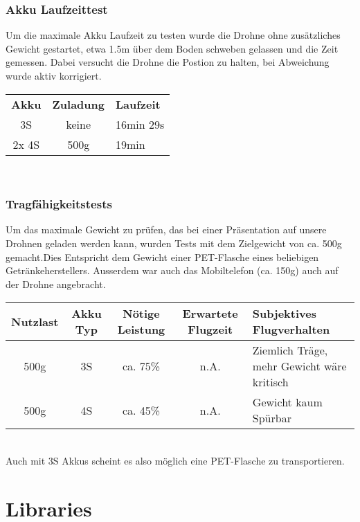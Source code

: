 \subsubsection{Akku Laufzeittest}
Um die maximale Akku Laufzeit zu testen wurde die Drohne ohne zusätzliches Gewicht gestartet, etwa 1.5m über dem Boden schweben gelassen und die Zeit gemessen. Dabei versucht die Drohne die Postion zu halten, bei Abweichung wurde aktiv korrigiert. \\

\begin{tabularx}{\textwidth}{|c|c|X}
    \hline
    \textbf{Akku} & \textbf{Zuladung}  & \textbf{Laufzeit} \\
    3S & keine & 16min 29s\\ \hline 
    2x 4S & 500g & 19min\\ \hline 
\end{tabularx}\\

\subsubsection{Tragfähigkeitstests}

Um das maximale Gewicht zu prüfen, das bei einer Präsentation auf unsere Drohnen geladen werden kann, wurden Tests mit dem Zielgewicht von ca. 500g gemacht.Dies Entspricht dem Gewicht einer PET-Flasche eines beliebigen Getränkeherstellers. Ausserdem war auch das Mobiltelefon (ca. 150g) auch auf der Drohne angebracht.  \\

\begin{tabularx}{\textwidth}{|c|c|c|c|X|}
	\hline
	\textbf{Nutzlast} & \textbf{Akku Typ} & \textbf{Nötige Leistung }& \textbf{Erwartete Flugzeit } & \textbf{Subjektives Flugverhalten }\\
	\hline \hline
	500g & 3S & ca. 75\%  & n.A. & Ziemlich Träge, mehr Gewicht wäre kritisch\\
	\hline
	500g & 4S & ca. 45\%  & n.A. & Gewicht kaum Spürbar\\
	\hline  
\end{tabularx}\\

Auch mit 3S Akkus scheint es also möglich eine PET-Flasche zu transportieren. 

\section{Libraries}

